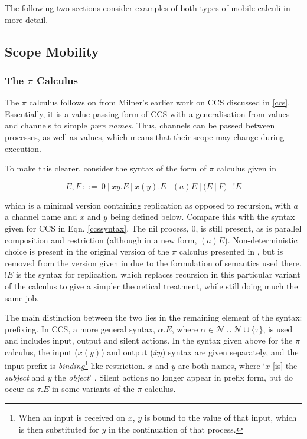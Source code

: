 The following two sections consider examples of both types of mobile
calculi in more detail.
 
\subsection{Scope Mobility}
\label{scopemobility}

\subsubsection{The $\pi$ Calculus}
\label{picalculus}

The $\pi$ calculus follows on from Milner's earlier work on CCS
discussed in \ref{ccs}. Essentially, it is a value-passing form of CCS
with a generalisation from values and channels to simple \emph{pure
  names}.  Thus, channels can be passed between processes, as well as
values, which means that their scope may change during execution.

To make this clearer, consider the syntax of the form of $\pi$ calculus
given in \cite{funcproc}

\begin{equation}
\label{pisyntax}
  E, F\ ::=\ 
  0\ |\ 
  \overline{x}y.E\ |\ 
  x(y).E\ |\ 
  (a)E\ |\ 
  (E\ |\ F)\ |\ 
  !E
\end{equation}
  
\noindent which is a minimal version containing replication as opposed
to recursion, with $a$ a channel name and $x$ and $y$ being defined
below.  Compare this with the syntax given for CCS in Eqn.
\ref{ccssyntax}.  The nil process, $0$, is still present, as is parallel
composition and restriction (although in a new form, $(a)E$).
Non-deterministic choice is present in the original version of the $\pi$
calculus presented in \cite{picalctutorial}, but is removed from the
version given in \cite{funcproc} due to the formulation of semantics
used there.  $!E$ is the syntax for replication, which replaces
recursion in this particular variant of the calculus to give a simpler
theoretical treatment, while still doing much the same job.

The main distinction between the two lies in the remaining element of
the syntax: prefixing.  In CCS, a more general syntax, $\alpha.E$,
where $\alpha \in \mathcal{N} \cup \overline{\mathcal{N}} \cup
\{\tau\}$, is used and includes input, output and silent actions.  In
the syntax given above for the $\pi$ calculus, the input ($x(y)$) and
output ($\overline{x}y$) syntax are given separately, and the input
prefix is \emph{binding}\footnote{When an input is received on $x$,
  $y$ is bound to the value of that input, which is then substituted
  for $y$ in the continuation of that process.} like restriction. $x$
and $y$ are both names, where `$x$ [is] the \emph{subject} and $y$ the
\emph{object}' \cite{funcproc}.  Silent actions no longer appear in
prefix form, but do occur as $\tau.E$ in some variants of the $\pi$
calculus.

